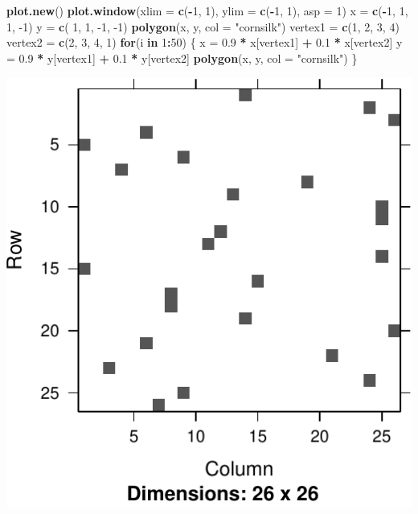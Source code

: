 \documentclass[]{book}
\newenvironment{Shaded}{\begin{snugshade}}{\end{snugshade}}
\newcommand{\ControlFlowTok}[1]{\textcolor[rgb]{0.13,0.29,0.53}{\textbf{#1}}}
\newcommand{\DataTypeTok}[1]{\textcolor[rgb]{0.13,0.29,0.53}{#1}}
\newcommand{\DecValTok}[1]{\textcolor[rgb]{0.00,0.00,0.81}{#1}}
\newcommand{\FloatTok}[1]{\textcolor[rgb]{0.00,0.00,0.81}{#1}}
\newcommand{\KeywordTok}[1]{\textcolor[rgb]{0.13,0.29,0.53}{\textbf{#1}}}
\newcommand{\NormalTok}[1]{#1}
\newcommand{\OperatorTok}[1]{\textcolor[rgb]{0.81,0.36,0.00}{\textbf{#1}}}
\newcommand{\StringTok}[1]{\textcolor[rgb]{0.31,0.60,0.02}{#1}}
\theoremstyle{definition}
\theoremstyle{definition}
\theoremstyle{definition}
\theoremstyle{remark}
\begin{document}
\begin{Shaded}
\begin{Highlighting}[]
\KeywordTok{plot.new}\NormalTok{()}
\KeywordTok{plot.window}\NormalTok{(}\DataTypeTok{xlim =} \KeywordTok{c}\NormalTok{(}\OperatorTok{-}\DecValTok{1}\NormalTok{, }\DecValTok{1}\NormalTok{), }\DataTypeTok{ylim =} \KeywordTok{c}\NormalTok{(}\OperatorTok{-}\DecValTok{1}\NormalTok{, }\DecValTok{1}\NormalTok{), }\DataTypeTok{asp =} \DecValTok{1}\NormalTok{)}
\NormalTok{x =}\StringTok{ }\KeywordTok{c}\NormalTok{(}\OperatorTok{-}\DecValTok{1}\NormalTok{, }\DecValTok{1}\NormalTok{, }\DecValTok{1}\NormalTok{, }\DecValTok{-1}\NormalTok{)}
\NormalTok{y =}\StringTok{ }\KeywordTok{c}\NormalTok{( }\DecValTok{1}\NormalTok{, }\DecValTok{1}\NormalTok{, }\DecValTok{-1}\NormalTok{, }\DecValTok{-1}\NormalTok{)}
\KeywordTok{polygon}\NormalTok{(x, y, }\DataTypeTok{col =} \StringTok{"cornsilk"}\NormalTok{)}
\NormalTok{vertex1 =}\StringTok{ }\KeywordTok{c}\NormalTok{(}\DecValTok{1}\NormalTok{, }\DecValTok{2}\NormalTok{, }\DecValTok{3}\NormalTok{, }\DecValTok{4}\NormalTok{)}
\NormalTok{vertex2 =}\StringTok{ }\KeywordTok{c}\NormalTok{(}\DecValTok{2}\NormalTok{, }\DecValTok{3}\NormalTok{, }\DecValTok{4}\NormalTok{, }\DecValTok{1}\NormalTok{)}
\ControlFlowTok{for}\NormalTok{(i }\ControlFlowTok{in} \DecValTok{1}\OperatorTok{:}\DecValTok{50}\NormalTok{) \{}
\NormalTok{    x =}\StringTok{ }\FloatTok{0.9} \OperatorTok{*}\StringTok{ }\NormalTok{x[vertex1] }\OperatorTok{+}\StringTok{ }\FloatTok{0.1} \OperatorTok{*}\StringTok{ }\NormalTok{x[vertex2]}
\NormalTok{    y =}\StringTok{ }\FloatTok{0.9} \OperatorTok{*}\StringTok{ }\NormalTok{y[vertex1] }\OperatorTok{+}\StringTok{ }\FloatTok{0.1} \OperatorTok{*}\StringTok{ }\NormalTok{y[vertex2]}
    \KeywordTok{polygon}\NormalTok{(x, y, }\DataTypeTok{col =} \StringTok{"cornsilk"}\NormalTok{)}
\NormalTok{\}}
\end{Highlighting}
\end{Shaded}

\includegraphics[width=0.5\linewidth]{Rcourse_files/figure-latex/unnamed-chunk-282-1}
\end{document}
